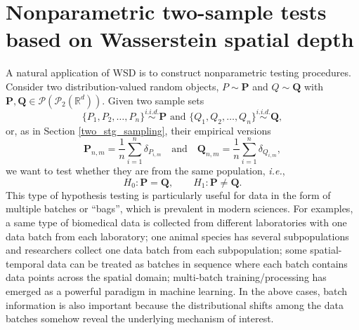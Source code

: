 \documentclass{imsart}
\numberwithin{equation}{section}
\def\R{\mathbb{R}}
\begin{document}
\section{Nonparametric two-sample tests based on Wasserstein spatial depth}\label{section:testing}
A natural application of WSD is to construct nonparametric testing procedures. 
Consider two distribution-valued random objects, $P\sim \mathbf{P}$ and $Q\sim \mathbf{Q}$ with $\mathbf{P}, \mathbf{Q} \in \mathcal{P}(\mathcal{P}_{2}(\R^d))$. Given two sample sets
\begin{equation*}
	\{P_1, P_2, \ldots, P_n\} \stackrel{\textit{i.i.d.}}{\sim} \mathbf{P} \text{ and } \{Q_1, Q_2, \ldots, Q_n\} \stackrel{\textit{i.i.d.}}{\sim} \mathbf{Q}, 
\end{equation*}
or, as in Section \ref{two_stg_sampling}, their empirical versions 
\begin{equation*}
	\mathbf{P}_{n,m} = 
	\frac{1}{n}
	\sum_{i=1}^n 
	\delta_{P_{i,m}}
	~ ~ ~
	\text{ and }
	~ ~ ~ 
	\mathbf{Q}_{n,m} =  \frac{1}{n}
	\sum_{i=1}^n 
	\delta_{Q_{i,m}},
\end{equation*}
we want to test whether they are from the same population, \textit{i.e.}, 
\begin{equation}\label{NPtest}
	H_0: \mathbf{P}=\mathbf{Q}, \qquad H_1: \mathbf{P}\neq\mathbf{Q}.
\end{equation}
This type of hypothesis testing is particularly useful for data in the form of multiple batches or ``bags'', which is prevalent in modern sciences.  
For examples, a same type of biomedical data is collected from different laboratories with one data batch from each laboratory; one animal species has several subpopulations and researchers collect one data batch from each subpopulation; some spatial-temporal data can be treated as batches in sequence where each batch contains data points across the spatial domain; multi-batch training/processing has emerged as a powerful paradigm in machine learning. %
In the above cases, batch information is also important because the distributional shifts among the data batches somehow reveal the underlying mechanism of interest. 
\end{document}
